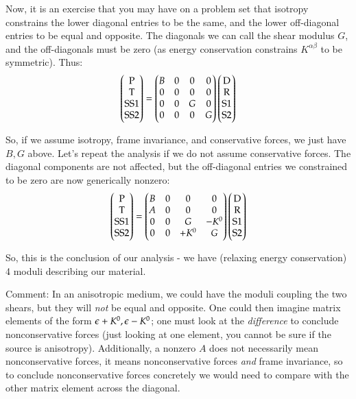 Now, it is an exercise that you may have on a problem set that isotropy constrains the lower diagonal entries to be the same, and the lower off-diagonal entries to be equal and opposite. The diagonals we can call the shear modulus $G$, and the off-diagonals must be zero (as energy conservation constrains $K^{\alpha\beta}$ to be symmetric). Thus:
\begin{equation}
    \begin{pmatrix}\text{P} \\ \text{T} \\ \text{SS1} \\ \text{SS2}\end{pmatrix} = \begin{pmatrix}B & 0 & 0 & 0 \\ 0 & 0 & 0 & 0 \\ 0 & 0 & G & 0 \\ 0 & 0 & 0 & G\end{pmatrix}\begin{pmatrix}\text{D} \\ \text{R} \\ \text{S1} \\ \text{S2}\end{pmatrix}
\end{equation}

So, if we assume isotropy, frame invariance, and conservative forces, we just have $B, G$ above. Let's repeat the analysis if we do not assume conservative forces. The diagonal components are not affected, but the off-diagonal entries we constrained to be zero are now generically nonzero:
\begin{equation}
    \begin{pmatrix}\text{P} \\ \text{T} \\ \text{SS1} \\ \text{SS2}\end{pmatrix} = \begin{pmatrix}B & 0 & 0 & 0 \\ A & 0 & 0 & 0 \\ 0 & 0 & G & -K^0 \\ 0 & 0 & +K^0 & G\end{pmatrix}\begin{pmatrix}\text{D} \\ \text{R} \\ \text{S1} \\ \text{S2}\end{pmatrix}
\end{equation}

So, this is the conclusion of our analysis - we have (relaxing energy conservation) 4 moduli describing our material. 

Comment: In an anisotropic medium, we could have the moduli coupling the two shears, but they will \emph{not} be equal and opposite. One could then imagine matrix elements of the form $\epsilon + K^0, \epsilon - K^0$; one must look at the \emph{difference} to conclude nonconservative forces (just looking at one element, you cannot be sure if the source is anisotropy). Additionally, a nonzero $A$ does not necessarily mean nonconservative forces, it means nonconservative forces \emph{and} frame invariance, so to conclude nonconservative forces concretely we would need to compare with the other matrix element across the diagonal.

